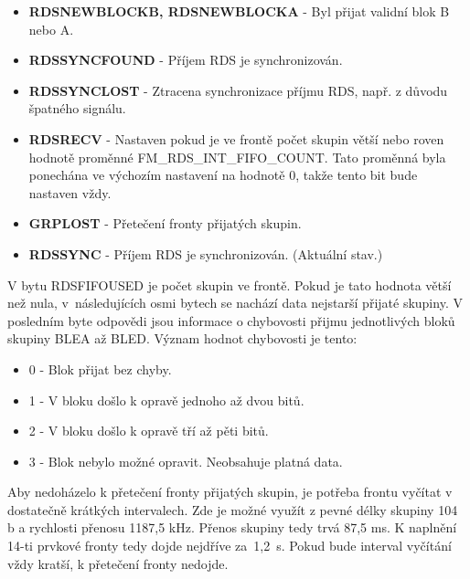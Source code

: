 \begin{itemize}
\item \textbf{RDSNEWBLOCKB, RDSNEWBLOCKA} - Byl přijat validní blok B nebo A.
\item \textbf{RDSSYNCFOUND} - Příjem RDS je synchronizován.
\item \textbf{RDSSYNCLOST} - Ztracena synchronizace příjmu RDS, např. z důvodu špatného signálu.
\item \textbf{RDSRECV} - Nastaven pokud je ve frontě počet skupin větší nebo roven hodnotě proměnné FM\_RDS\_INT\_FIFO\_COUNT. Tato proměnná byla ponechána ve výchozím nastavení na hodnotě 0, takže tento bit bude nastaven vždy.
\item \textbf{GRPLOST} - Přetečení fronty přijatých skupin.
\item \textbf{RDSSYNC} - Příjem RDS je synchronizován. (Aktuální stav.)
\end{itemize}

V bytu RDSFIFOUSED je počet skupin ve frontě. Pokud je tato hodnota větší než nula, v~následujících osmi bytech se nachází data nejstarší přijaté skupiny. V posledním byte odpovědi jsou informace o chybovosti přijmu jednotlivých bloků skupiny BLEA až BLED. Význam hodnot chybovosti je tento:

\begin{itemize}
\item 0 - Blok přijat bez chyby.
\item 1 - V bloku došlo k opravě jednoho až dvou bitů. 
\item 2 - V bloku došlo k opravě tří až pěti bitů.
\item 3 - Blok nebylo možné opravit. Neobsahuje platná data.
\end{itemize} 

Aby nedoházelo k přetečení fronty přijatých skupin, je potřeba frontu vyčítat v dostatečně krátkých intervalech. Zde je možné využít z pevné délky skupiny 104 b a rychlosti přenosu 1187,5 kHz. Přenos skupiny tedy trvá 87,5 ms. K naplnění 14-ti prvkové fronty tedy dojde nejdříve za~1,2~s. Pokud bude interval vyčítání vždy kratší, k přetečení fronty nedojde.
